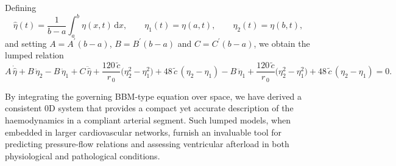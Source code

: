 \documentclass[alpha-refs, 12pt]{wiley-article}
\newcommand{\ud}{\mathrm{d}}
\begin{document}
Defining
\[
  \hat{\eta}(t)=\frac{1}{b-a}\int_{a}^{b}\eta(x,t)\,\ud x,\qquad
  \eta_{1}(t)=\eta(a,t),\qquad
  \eta_{2}(t)=\eta(b,t),
\]
and setting
\(A=A^{\prime}(b-a)\), \(B=B^{\prime}(b-a)\) and
\(C=C^{\prime}(b-a)\), we obtain the lumped relation
\begin{equation}\label{eq:chap6.5}
  A\,\dot{\hat{\eta}}
  +B\,\ddot{\eta}_{2}
  -B\,\ddot{\eta}_{1}
  +C\,\ddot{\hat{\eta}}
  +\frac{120\,\tilde{c}}{r_{\,0}}\bigl(\eta_{2}^{2}-\eta_{1}^{2}\bigr)
  +48\,\tilde{c}\,(\eta_{2}-\eta_{1})
  -B\,\ddot{\eta}_{1}
  +\frac{120\,\tilde{c}}{r_{\,0}}\bigl(\eta_{2}^{2}-\eta_{1}^{2}\bigr)
  +48\,\tilde{c}\,(\eta_{2}-\eta_{1})=0.
\end{equation}

By integrating the governing BBM-type equation over space, we have derived a consistent 0D system that provides a compact yet accurate description of the haemodynamics in a compliant arterial segment. Such lumped models, when embedded in larger cardiovascular networks, furnish an invaluable tool for predicting pressure-flow relations and assessing ventricular afterload in both physiological and pathological conditions.
\end{document}
